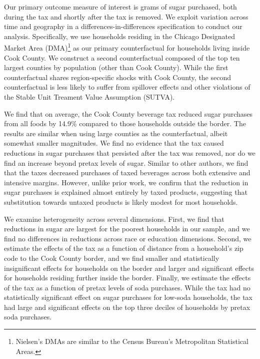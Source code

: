 \documentclass[12pt]{article}
\begin{document}
Our primary outcome measure of interest is grams of sugar purchased, both during the tax and shortly after the tax is removed. We exploit variation across time and geography in a differences-in-differences specification to conduct our analysis. Specifically, we use households residing in the Chicago Designated Market Area (DMA)\footnote{Nielsen's DMAs are similar to the Census Bureau's Metropolitan Statistical Areas.} as our primary counterfactual for households living inside Cook County. We construct a second counterfactual composed of the top ten largest counties by population (other than Cook County). While the first counterfactual shares region-specific shocks with Cook County, the second counterfactual is less likely to suffer from spillover effects and other violations of the Stable Unit Treament Value Assumption (SUTVA).

We find that on average, the Cook County beverage tax reduced sugar purchases from all foods by 14.9\% compared to those households outside the border. The results are similar when using large counties as the counterfactual, albeit somewhat smaller magnitudes. We find no evidence that the tax caused reductions in sugar purchases that persisted after the tax was removed, nor do we find an increase beyond pretax levels of sugar. Similar to other authors, we find that the taxes decreased purchases of taxed beverages across both extensive and intensive margins. However, unlike prior work, we confirm that the reduction in sugar purchases is explained almost entirely by taxed products, suggesting that substitution towards untaxed products is likely modest for most households.

We examine heterogeneity across several dimensions. First, we find that reductions in sugar are largest for the poorest households in our sample, and we find no differences in reductions across race or education dimensions. Second, we estimate the effects of the tax as a function of distance from a household's zip code to the Cook County border, and we find smaller and statistically insignificant effects for households on the border and larger and significant effects for households residing further inside the border. Finally, we estimate the effects of the tax as a function of pretax levels of soda purchases. While the tax had no statistically significant effect on sugar purchases for low-soda households, the tax had large and significant effects on the top three deciles of households by pretax soda purchases.
\end{document}

